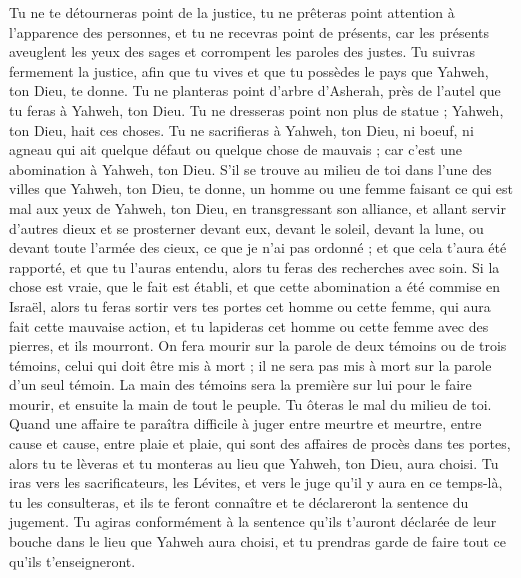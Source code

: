 \begin{multicols}{2}
Tu ne te détourneras point de la justice, tu ne prêteras point attention à l'apparence des personnes, et tu ne recevras point de présents, car les présents aveuglent les yeux des sages et corrompent les paroles des justes.
Tu suivras fermement la justice, afin que tu vives et que tu possèdes le pays que Yahweh, ton Dieu, te donne.
Tu ne planteras point d'arbre d'Asherah, près de l'autel que tu feras à Yahweh, ton Dieu.
Tu ne dresseras point non plus de statue ; Yahweh, ton Dieu, hait ces choses.
\VerseOne{}Tu ne sacrifieras à Yahweh, ton Dieu, ni boeuf, ni agneau qui ait quelque défaut ou quelque chose de mauvais ; car c'est une abomination à Yahweh, ton Dieu.
S'il se trouve au milieu de toi dans l'une des villes que Yahweh, ton Dieu, te donne, un homme ou une femme faisant ce qui est mal aux yeux de Yahweh, ton Dieu, en transgressant son alliance,
et allant servir d'autres dieux et se prosterner devant eux, devant le soleil, devant la lune, ou devant toute l'armée des cieux, ce que je n'ai pas ordonné ;
et que cela t'aura été rapporté, et que tu l'auras entendu, alors tu feras des recherches avec soin. Si la chose est vraie, que le fait est établi, et que cette abomination a été commise en Israël,
alors tu feras sortir vers tes portes cet homme ou cette femme, qui aura fait cette mauvaise action, et tu lapideras cet homme ou cette femme avec des pierres, et ils mourront.
On fera mourir sur la parole de deux témoins ou de trois témoins, celui qui doit être mis à mort ; il ne sera pas mis à mort sur la parole d'un seul témoin.
La main des témoins sera la première sur lui pour le faire mourir, et ensuite la main de tout le peuple. Tu ôteras le mal du milieu de toi.
Quand une affaire te paraîtra difficile à juger entre meurtre et meurtre, entre cause et cause, entre plaie et plaie, qui sont des affaires de procès dans tes portes, alors tu te lèveras et tu monteras au lieu que Yahweh, ton Dieu, aura choisi.
Tu iras vers les sacrificateurs, les Lévites, et vers le juge qu'il y aura en ce temps-là, tu les consulteras, et ils te feront connaître et te déclareront la sentence du jugement.
Tu agiras conformément à la sentence qu'ils t'auront déclarée de leur bouche dans le lieu que Yahweh aura choisi, et tu prendras garde de faire tout ce qu'ils t'enseigneront.

\end{multicols}
